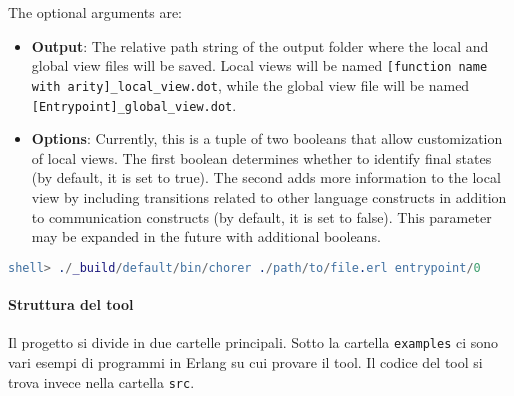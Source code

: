 \noindent The optional arguments are:
\begin{itemize}
    \item \textbf{Output}: The relative path string of the output folder where the local and global view files will be saved. Local views will be named \texttt{[function name with arity]\_local\_view.dot}, while the global view file will be named \texttt{[Entrypoint]\_global\_view.dot}.
    \item \textbf{Options}: Currently, this is a tuple of two booleans that allow customization of local views. The first boolean determines whether to identify final states (by default, it is set to true). The second adds more information to the local view by including transitions related to other language constructs in addition to communication constructs (by default, it is set to false). This parameter may be expanded in the future with additional booleans.
\end{itemize}

\begin{lstlisting}[language=Erlang, caption=Use example of the tool]
 shell> ./_build/default/bin/chorer ./path/to/file.erl entrypoint/0
\end{lstlisting}

\paragraph{Struttura del tool}
Il progetto si divide in due cartelle principali. Sotto la cartella \texttt{examples} ci sono vari esempi di programmi in Erlang su cui provare il tool. Il codice del tool si trova invece nella cartella \texttt{src}. 

\bigskip


\bigskip

